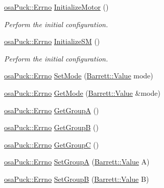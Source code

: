 \begin{DoxyCompactItemize}
\hyperlink{classosa_puck_af19c88d20083577d3a676353b4902391}{osa\-Puck\-::\-Errno} \hyperlink{classosa_puck_a823b0dc8f1c91f8191fc0bef2d8750e6}{Initialize\-Motor} ()
\begin{DoxyCompactList}\small\item\em Perform the initial configuration. \end{DoxyCompactList}\item 
\hyperlink{classosa_puck_af19c88d20083577d3a676353b4902391}{osa\-Puck\-::\-Errno} \hyperlink{classosa_puck_a9278ec33b788b5b1ab031438dac75031}{Initialize\-S\-M} ()
\begin{DoxyCompactList}\small\item\em Perform the initial configuration. \end{DoxyCompactList}\item 
\hyperlink{classosa_puck_af19c88d20083577d3a676353b4902391}{osa\-Puck\-::\-Errno} \hyperlink{classosa_puck_a6f4f3b64404db16746a36b16a505b5c5}{Set\-Mode} (\hyperlink{struct_barrett_a57ff132885344ca62e4b4b691885685b}{Barrett\-::\-Value} mode)
\item 
\hyperlink{classosa_puck_af19c88d20083577d3a676353b4902391}{osa\-Puck\-::\-Errno} \hyperlink{classosa_puck_a490be0a5ec443b71d6fcc8d1d74129e3}{Get\-Mode} (\hyperlink{struct_barrett_a57ff132885344ca62e4b4b691885685b}{Barrett\-::\-Value} \&mode)
\item 
\hyperlink{classosa_puck_af19c88d20083577d3a676353b4902391}{osa\-Puck\-::\-Errno} \hyperlink{classosa_puck_afc00d4aa540e8b7d64c5ea9fd386a18d}{Get\-Group\-A} ()
\item 
\hyperlink{classosa_puck_af19c88d20083577d3a676353b4902391}{osa\-Puck\-::\-Errno} \hyperlink{classosa_puck_a8f07dab0ed24df69c9305e5f1fefb8d4}{Get\-Group\-B} ()
\item 
\hyperlink{classosa_puck_af19c88d20083577d3a676353b4902391}{osa\-Puck\-::\-Errno} \hyperlink{classosa_puck_a6e53a5943b1a42fdc1e2b41b315a8481}{Get\-Group\-C} ()
\item 
\hyperlink{classosa_puck_af19c88d20083577d3a676353b4902391}{osa\-Puck\-::\-Errno} \hyperlink{classosa_puck_adfb90a624491772ff63121ac4f4b461d}{Set\-Group\-A} (\hyperlink{struct_barrett_a57ff132885344ca62e4b4b691885685b}{Barrett\-::\-Value} A)
\item 
\hyperlink{classosa_puck_af19c88d20083577d3a676353b4902391}{osa\-Puck\-::\-Errno} \hyperlink{classosa_puck_af0994616e3b62d2e62febae173a31ade}{Set\-Group\-B} (\hyperlink{struct_barrett_a57ff132885344ca62e4b4b691885685b}{Barrett\-::\-Value} B)
\item 

\end{DoxyCompactItemize}
